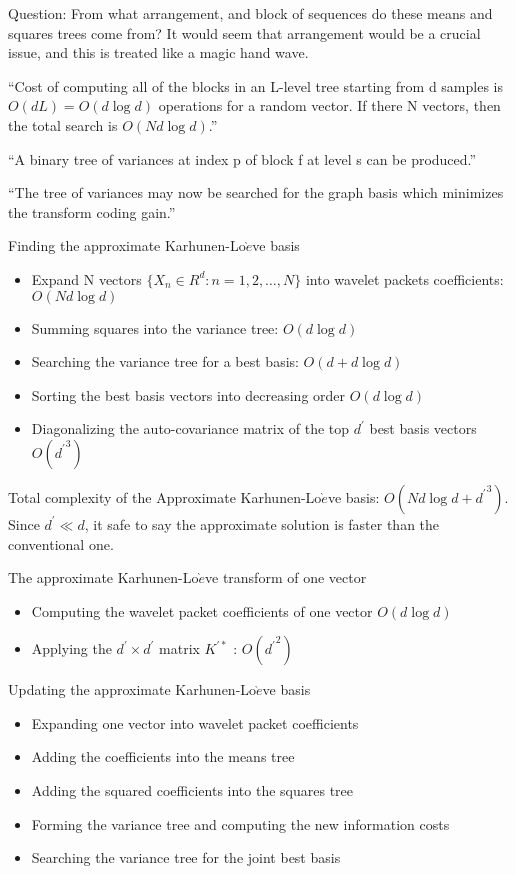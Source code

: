 \documentclass[11pt]{book}
\begin{document}
Question:  From what arrangement, and block of sequences do these means and squares trees come from?  It would seem that arrangement would be a crucial issue, and this is treated like a magic hand wave.  

``Cost of computing all of the blocks in an L-level tree starting from d samples is $O(dL)=O(d\log d)$ operations for a random vector.  If there N vectors, then the total search is $O(Nd\log d)$.''

``A  binary tree of variances at index p of block f at level s can be produced.''

``The tree of variances may now be searched for the graph basis which minimizes the transform coding gain.''
 
 
 Finding the approximate Karhunen-Lo$\grave{e}$ve basis 
 \begin{itemize}
\item Expand N vectors $\{X_n \in R^d : n = 1,2, \ldots ,N\}$ into wavelet packets coefficients: $O(Nd\log d)$
 \item Summing squares into the variance tree: $O(d \log d)$
 \item Searching the variance tree for a best basis: $O(d+d\log d)$
 \item Sorting the best basis vectors into decreasing order $O(d \log d)$
 \item Diagonalizing the auto-covariance matrix of the top $d^\prime$ best basis vectors $O({d^\prime}^3)$
\end{itemize}

Total complexity of the Approximate Karhunen-Lo$\grave{e}$ve basis: $O(Nd\log d + {d^\prime}^3)$.  Since $d^\prime \ll d$, it safe to say the approximate solution is faster than the conventional one. 

The approximate Karhunen-Lo$\grave{e}$ve transform of one vector 
\begin{itemize}
\item Computing the wavelet packet coefficients of one vector $O(d \log d)$
\item Applying the $d^\prime \times d^\prime$ matrix $K^{\prime \ast}$ : $O({d^\prime}^2)$
\end{itemize}

Updating the approximate Karhunen-Lo$\grave{e}$ve basis 
\begin{itemize}
\item Expanding one vector into wavelet packet coefficients 
\item Adding the coefficients into the means tree
\item Adding the squared coefficients into the squares tree
\item Forming the variance tree and computing the new information costs
\item Searching the variance tree for the joint best basis
\end{itemize}
\end{document}
